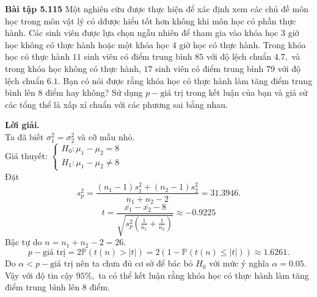 \begin{mybox}
\textbf{Bài tập 5.115} Một nghiên cứu được thực hiện để xác định xem các chủ đề môn học trong môn vật lý có dđược hiểu tốt hơn không khi môn học có phần thực hành. Các sinh viên được lựa chọn ngẫu nhiên để tham gia vào khóa học $3$ giờ học không có thực hành hoặc một khóa học $4$ giờ học có thực hành. Trong khóa học có thực hành $11$ sinh viên có điểm trung bình $85$ với độ lệch chuẩn $4.7,$ và trong khóa học không có thực hành, $17$ sinh viên có điểm trung bình $79$ với độ lệch chuẩn $6.1.$ Bạn có nói được rằng khóa học có thực hành làm tăng điểm trung bình lên $8$ điểm hay không? Sử dụng $p-\text{giá trị}$ trong kết luận của bạn và giả sử các tổng thể là xấp xỉ chuẩn với các phương sai bằng nhau. 
\end{mybox}
\textbf{Lời giải.}\\
Ta đã biết $\sigma_1^2 = \sigma_2^2 $ và cỡ mẫu nhỏ.\\
Giả thuyết: $\begin{cases}
H_0: \mu_1 - \mu_2 = 8\\
H_1: \mu_1 - \mu_2 \ne 8
\end{cases}$\\
Đặt $$s_p^2 = \frac{{\left( {{n_1} - 1} \right)s_1^2 + \left( {{n_2} - 1} \right)s_2^2}}{{{n_1} + {n_2} - 2}} = 31.3946.$$
$$t = \frac{{\overline {{x_1}}  - \overline {{x_2}} } - 8}{{\sqrt {s_p^2\left( {\frac{1}{{{n_1}}} + \frac{1}{{{n_2}}}} \right)} }} \approx -0.9225$$
Bậc tự do $n = n_1 + n_2 - 2 = 26.$
$$p-\text{giá trị} = 2\mathbb{P}\left( {t\left( n \right) > \left| t \right|} \right) = 2\left( {1 - \mathbb{P}\left( {t\left( n \right) \leqslant \left| t \right|} \right)} \right) \approx 1.6261.$$
Do $\alpha < p-\text{giá trị}$ nên ta chưa đủ cơ sở để bác bỏ $H_0$ với mức ý nghĩa $\alpha = 0.05.$\\
Vậy với độ tin cậy $95\%,$ ta có thể kết luận rằng khóa học có thực hành làm tăng điểm trung bình lên $8$ điểm.

